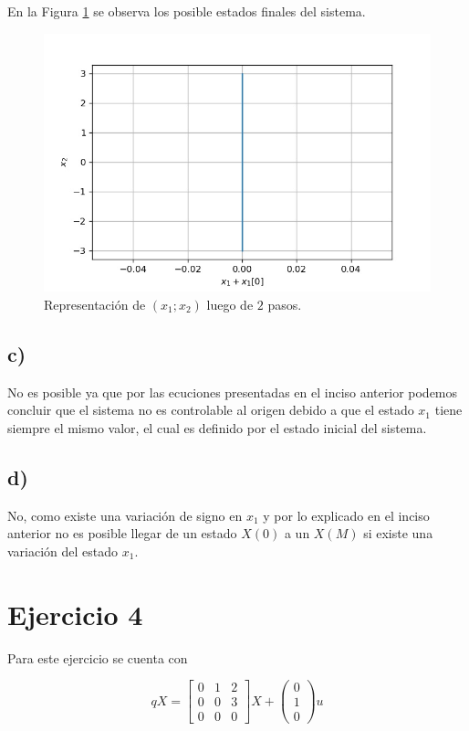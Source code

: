 \documentclass[11pt,a4paper]{article}
\begin{document}
        En la Figura \ref{fig:3-b} se observa los posible estados finales del sistema.

        \begin{figure}
            \centering 
            \includegraphics[width=.5\textwidth]{Img/3-b.jpg}
            \caption{Representación de $(x_1;x_2)$ luego de $2$ pasos.}
            \label{fig:3-b}
        \end{figure} 

    \subsection*{c)}

    No es posible ya que por las ecuciones presentadas en el inciso anterior podemos concluir que 
    el sistema no es controlable al origen debido a que el estado $x_1$ tiene siempre el mismo valor,
    el cual es definido por el estado inicial del sistema.

    \subsection*{d)}

    No, como existe una variación de signo en $x_1$ y por lo explicado en el inciso anterior no 
    es posible llegar de un estado $X(0)$ a un $X(M)$ si existe una variación del estado 
    $x_1$.

    \section*{Ejercicio 4}

    Para este ejercicio se cuenta con 

    \begin{equation}
        qX = 
        \begin{bmatrix}
            0 & 1 & 2 \\ 
            0 & 0 & 3 \\ 
            0 & 0 & 0 
        \end{bmatrix} X 
        + 
        \begin{pmatrix}
            0 \\ 1 \\ 0
        \end{pmatrix} u
    \end{equation}
\end{document}
